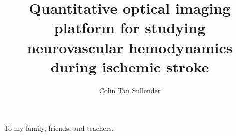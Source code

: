 \documentclass[12pt]{report}
\author{Colin Tan Sullender}
\title{Quantitative optical imaging platform for studying neurovascular hemodynamics during ischemic stroke}
\begin{document}
\copyrightpage      %
\commcertpage       %
\titlepage          %


\begin{dedication}
To my family, friends, and teachers.
\end{dedication}


\begin{acknowledgments}

\blindtext

\end{acknowledgments}


\utabstract
\indent
\blindtext

\tableofcontents
\listoftables
\listoffigures
















\appendices


\end{document}
